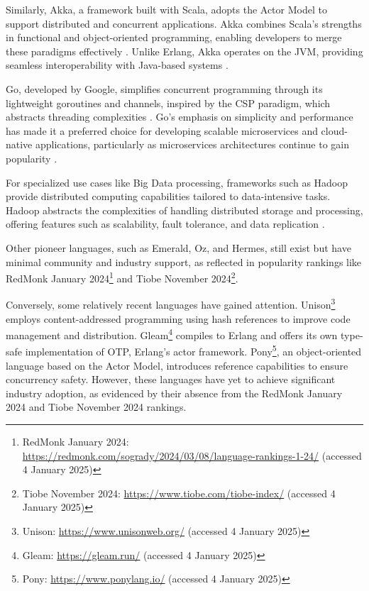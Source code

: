 Similarly, Akka, a framework built with Scala, adopts the Actor Model to support distributed and concurrent applications. Akka combines Scala’s strengths in functional and object-oriented programming, enabling developers to merge these paradigms effectively \cite{Valkov2018}. Unlike Erlang, Akka operates on the \gls{JVM}, providing seamless interoperability with Java-based systems \cite{Abraham2023}.

Go, developed by Google, simplifies concurrent programming through its lightweight goroutines and channels, inspired by the \gls{CSP} paradigm, which abstracts threading complexities \cite{Brolos2021}. Go’s emphasis on simplicity and performance has made it a preferred choice for developing scalable microservices and cloud-native applications, particularly as microservices architectures continue to gain popularity \cite{go-docs}.

For specialized use cases like Big Data processing, frameworks such as Hadoop provide distributed computing capabilities tailored to data-intensive tasks. Hadoop abstracts the complexities of handling distributed storage and processing, offering features such as scalability, fault tolerance, and data replication \cite{Polato2014}.

Other pioneer languages, such as Emerald, Oz, and Hermes, still exist but have minimal community and industry support, as reflected in popularity rankings like RedMonk January 2024\footnote{RedMonk January 2024: \url{https://redmonk.com/sogrady/2024/03/08/language-rankings-1-24/} (accessed 4 January 2025)} and Tiobe November 2024\footnote{Tiobe November 2024: \url{https://www.tiobe.com/tiobe-index/} (accessed 4 January 2025)}.

Conversely, some relatively recent languages have gained attention. Unison\footnote{Unison: \url{https://www.unisonweb.org/} (accessed 4 January 2025)} employs content-addressed programming using hash references to improve code management and distribution. Gleam\footnote{Gleam: \url{https://gleam.run/} (accessed 4 January 2025)} compiles to Erlang and offers its own type-safe implementation of \gls{OTP}, Erlang’s actor framework. Pony\footnote{Pony: \url{https://www.ponylang.io/} (accessed 4 January 2025)}, an object-oriented language based on the Actor Model, introduces reference capabilities to ensure concurrency safety. However, these languages have yet to achieve significant industry adoption, as evidenced by their absence from the RedMonk January 2024 and Tiobe November 2024 rankings.

